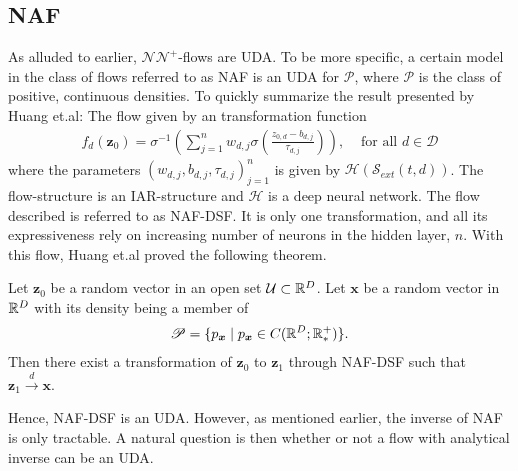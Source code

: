 \subsection{NAF}
As alluded to earlier, \(\mathcal{NN}^{+}\)-flows are UDA. To be more specific, a certain model in the class of flows 
referred to as NAF is an UDA for \(\mathscr{P}\), where \(\mathscr{P}\)
is the class of positive, continuous densities. To quickly summarize the result presented by Huang et.al: The flow given by
an transformation function
\begin{align}\label{eq:naf}
    f_{d}(\bm z_{0}) = \sigma^{-1}\left(\sum_{j=1}^n w_{d,j} \sigma\left(\frac{z_{0,d} - b_{d,j}}{\tau_{d,j}}\right)\right),
    & \text{ for all \(d \in \mathcal{D}\)}
\end{align}
where the parameters \((w_{d,j}, b_{d,j}, \tau_{d,j})^{n}_{j=1}\) is given by \(\mathcal{H}(\mathcal{S}_{ext}(t,d))\).
The flow-structure is an IAR-structure and \(\mathcal{H}\) is a deep neural network. 
The flow described is referred to as NAF-DSF.
It is only one transformation, and all its expressiveness rely on increasing number of 
neurons in the hidden layer, \(n\). With this flow, Huang et.al proved the following theorem.
\begin{theorem}
    Let \(\bm z_0\) be a random vector in an open set \(\mathcal{U} \subset \mathbb{R}^D\).
    Let \(\bm x\) be a random vector in \(\mathbb{R}^D\) with its density being a member of 
    \begin{align*}
        \mathscr{P} = \{p_{\boldsymbol{x}}\mid p_{\boldsymbol{x}}\in C(\mathbb{R}^D;\mathbb{R}_*^{+})\}.
    \end{align*}
    Then there exist a transformation
    of \(\bm z_0\) to \(\bm z_1\) through NAF-DSF such that 
    \(\bm z_1 \xrightarrow{d} \bm x\). 
\end{theorem}
Hence, NAF-DSF is an UDA. However, as mentioned earlier, the inverse of NAF is only tractable. A 
natural question is then whether or not a flow with analytical inverse can be an UDA.

